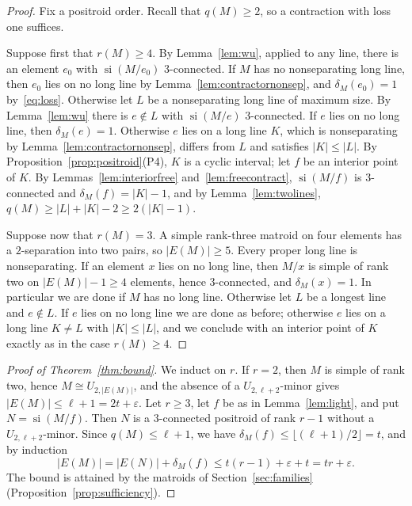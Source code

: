 \documentclass[11pt]{amsart}
\theoremstyle{definition}
\theoremstyle{remark}
\numberwithin{equation}{section}
\newcommand{\si}{\operatorname{si}}
\begin{document}
\begin{proof}
Fix a positroid order. Recall that $q(M)\ge2$, so a contraction with loss one suffices.

Suppose first that $r(M)\ge4$. By Lemma~\ref{lem:wu}, applied to any line, there is an element $e_0$ with $\si(M/e_0)$ $3$-connected. If $M$ has no nonseparating long line, then $e_0$ lies on no long line by Lemma~\ref{lem:contractornonsep}, and $\delta_M(e_0)=1$ by~\eqref{eq:loss}. Otherwise let $L$ be a nonseparating long line of maximum size. By Lemma~\ref{lem:wu} there is $e\notin L$ with $\si(M/e)$ $3$-connected. If $e$ lies on no long line, then $\delta_M(e)=1$. Otherwise $e$ lies on a long line $K$, which is nonseparating by Lemma~\ref{lem:contractornonsep}, differs from $L$ and satisfies $|K|\le|L|$. By Proposition~\ref{prop:positroid}(P4), $K$ is a cyclic interval; let $f$ be an interior point of $K$. By Lemmas~\ref{lem:interiorfree} and~\ref{lem:freecontract}, $\si(M/f)$ is $3$-connected and $\delta_M(f)=|K|-1$, and by Lemma~\ref{lem:twolines}, $q(M)\ge|L|+|K|-2\ge2(|K|-1)$.

Suppose now that $r(M)=3$. A simple rank-three matroid on four elements has a $2$-separation into two pairs, so $|E(M)|\ge5$. Every proper long line is nonseparating. If an element $x$ lies on no long line, then $M/x$ is simple of rank two on $|E(M)|-1\ge4$ elements, hence $3$-connected, and $\delta_M(x)=1$. In particular we are done if $M$ has no long line. Otherwise let $L$ be a longest line and $e\notin L$. If $e$ lies on no long line we are done as before; otherwise $e$ lies on a long line $K\ne L$ with $|K|\le|L|$, and we conclude with an interior point of $K$ exactly as in the case $r(M)\ge4$.
\end{proof}

\begin{proof}[Proof of Theorem~\ref{thm:bound}]
We induct on $r$. If $r=2$, then $M$ is simple of rank two, hence $M\cong U_{2,|E(M)|}$, and the absence of a $U_{2,\ell+2}$-minor gives $|E(M)|\le\ell+1=2t+\varepsilon$. Let $r\ge3$, let $f$ be as in Lemma~\ref{lem:light}, and put $N=\si(M/f)$. Then $N$ is a $3$-connected positroid of rank $r-1$ without a $U_{2,\ell+2}$-minor. Since $q(M)\le\ell+1$, we have $\delta_M(f)\le\lfloor(\ell+1)/2\rfloor=t$, and by induction
\[
|E(M)|=|E(N)|+\delta_M(f)\le t(r-1)+\varepsilon+t=tr+\varepsilon.
\]
The bound is attained by the matroids of Section~\ref{sec:families} (Proposition~\ref{prop:sufficiency}).
\end{proof}
\end{document}
